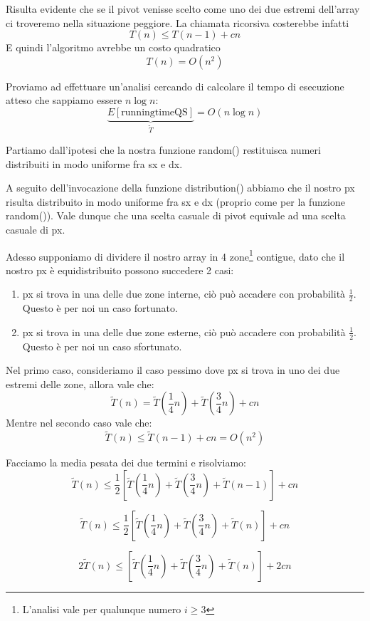 \documentclass[a4paper,11pt]{book}
\begin{document}
Risulta evidente che se il pivot venisse scelto come uno dei due estremi dell'array ci troveremo nella situazione peggiore.
La chiamata ricorsiva costerebbe infatti $$T(n) \leq T(n-1) + cn$$ E quindi l'algoritmo avrebbe un costo quadratico $$T(n) = O(n^2)$$

Proviamo ad effettuare un'analisi cercando di calcolare il tempo di esecuzione atteso che sappiamo essere $n\log n$:
$$\underbrace{E[\mbox{runningtimeQS}]}_{\tilde{T}} = O(n\log n)$$

Partiamo dall'ipotesi che la nostra funzione \textsf{random()} restituisca numeri distribuiti in modo uniforme fra sx e dx.

A seguito dell'invocazione della funzione \textsf{distribution()} abbiamo che il nostro px risulta distribuito in modo uniforme fra sx e dx (proprio come per la funzione \textsf{random()}). Vale dunque che una scelta casuale di pivot equivale ad una scelta casuale di px.

Adesso supponiamo di dividere il nostro array in 4 zone\footnote{L'analisi vale per qualunque numero $i \geq 3$} contigue, dato che il nostro px \`e equidistribuito possono succedere 2 casi:

\begin{enumerate}
\item px si trova in una delle due zone interne, ci\`o pu\`o accadere con probabilit\`a $\frac{1}{2}$. Questo \`e per noi un caso fortunato.
\item px si trova in una delle due zone esterne, ci\`o pu\`o accadere con probabilit\`a $\frac{1}{2}$. Questo \`e per noi un caso sfortunato.
\end{enumerate}

Nel primo caso, consideriamo il caso pessimo dove px si trova in uno dei due estremi delle zone, allora vale che: 
$$\tilde{T}(n) = \tilde{T}\left(\frac{1}{4}n\right) + \tilde{T}\left(\frac{3}{4}n\right) + cn$$
Mentre nel secondo caso vale che:$$\tilde{T}(n) \leq \tilde{T}(n-1) + cn = O(n^2)$$

Facciamo la media pesata dei due termini e risolviamo:
$$\tilde{T}(n) \leq \frac{1}{2}\left[\tilde{T}\left(\frac{1}{4}n\right) + \tilde{T}\left(\frac{3}{4}n\right) + \tilde{T}(n-1)\right] + cn$$

$$\tilde{T}(n) \leq \frac{1}{2}\left[\tilde{T}\left(\frac{1}{4}n\right) + \tilde{T}\left(\frac{3}{4}n\right) + \tilde{T}(n)\right] + cn$$

$$2\tilde{T}(n) \leq \left[\tilde{T}\left(\frac{1}{4}n\right) + \tilde{T}\left(\frac{3}{4}n\right) + \tilde{T}(n)\right] + 2cn$$
\end{document}
